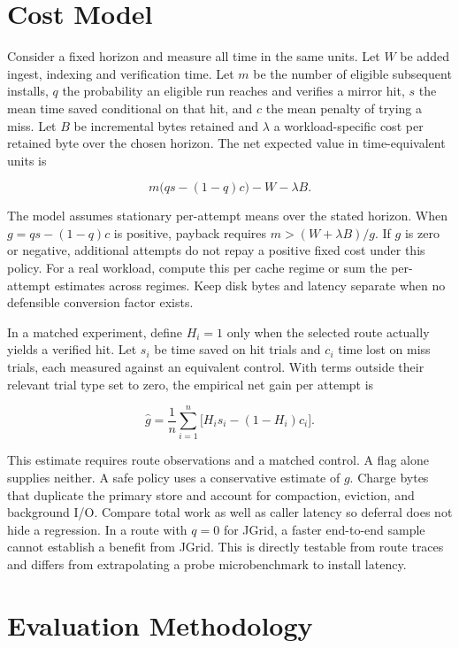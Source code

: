 \documentclass[
  11pt,
  letterpaper,
]{article}
\begin{document}
\section{Cost Model}\label{cost-model}

Consider a fixed horizon and measure all time in the same units. Let
\(W\) be added ingest, indexing and verification time. Let \(m\) be the
number of eligible subsequent installs, \(q\) the probability an
eligible run reaches and verifies a mirror hit, \(s\) the mean time
saved conditional on that hit, and \(c\) the mean penalty of trying a
miss. Let \(B\) be incremental bytes retained and \(\lambda\) a
workload-specific cost per retained byte over the chosen horizon. The
net expected value in time-equivalent units is

\[m\big(qs-(1-q)c\big)-W-\lambda B.\]

The model assumes stationary per-attempt means over the stated horizon.
When \(g=qs-(1-q)c\) is positive, payback requires
\(m>(W+\lambda B)/g\). If \(g\) is zero or negative, additional attempts
do not repay a positive fixed cost under this policy. For a real
workload, compute this per cache regime or sum the per-attempt estimates
across regimes. Keep disk bytes and latency separate when no defensible
conversion factor exists.

In a matched experiment, define \(H_i=1\) only when the selected route
actually yields a verified hit. Let \(s_i\) be time saved on hit trials
and \(c_i\) time lost on miss trials, each measured against an
equivalent control. With terms outside their relevant trial type set to
zero, the empirical net gain per attempt is

\[\widehat{g}=\frac{1}{n}\sum_{i=1}^{n}\bigl[H_i s_i-(1-H_i)c_i\bigr].\]

This estimate requires route observations and a matched control. A flag
alone supplies neither. A safe policy uses a conservative estimate of
\(g\). Charge bytes that duplicate the primary store and account for
compaction, eviction, and background I/O. Compare total work as well as
caller latency so deferral does not hide a regression. In a route with
\(q=0\) for JGrid, a faster end-to-end sample cannot establish a benefit
from JGrid. This is directly testable from route traces and differs from
extrapolating a probe microbenchmark to install latency.

\section{Evaluation Methodology}\label{evaluation-methodology}
\end{document}
